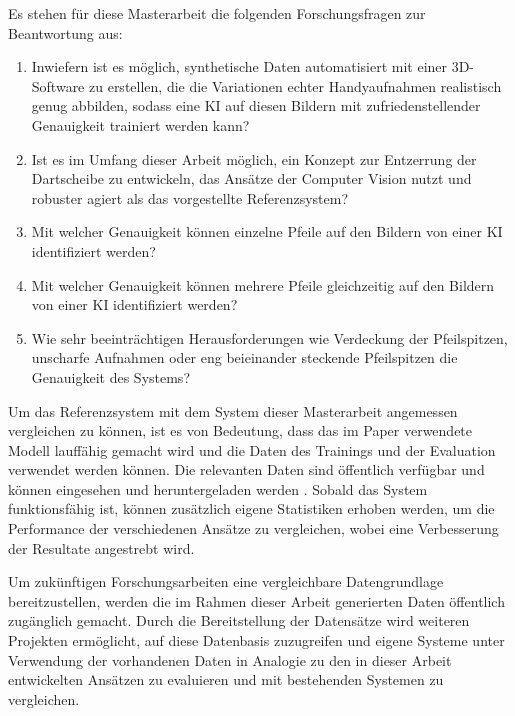 Es stehen für diese Masterarbeit die folgenden Forschungsfragen zur Beantwortung aus:

\begin{enumerate}
    \item Inwiefern ist es möglich, synthetische Daten automatisiert mit einer 3D-Software zu erstellen, die die Variationen echter Handyaufnahmen realistisch genug abbilden, sodass eine KI auf diesen Bildern mit zufriedenstellender Genauigkeit trainiert werden kann?
    \item Ist es im Umfang dieser Arbeit möglich, ein Konzept zur Entzerrung der Dartscheibe zu entwickeln, das Ansätze der Computer Vision nutzt und robuster agiert als das vorgestellte Referenzsystem?
    \item Mit welcher Genauigkeit können einzelne Pfeile auf den Bildern von einer KI identifiziert werden?
    \item Mit welcher Genauigkeit können mehrere Pfeile gleichzeitig auf den Bildern von einer KI identifiziert werden?
    \item Wie sehr beeinträchtigen Herausforderungen wie Verdeckung der Pfeilspitzen, unscharfe Aufnahmen oder eng beieinander steckende Pfeilspitzen die Genauigkeit des Systems?
\end{enumerate}

Um das Referenzsystem mit dem System dieser Masterarbeit angemessen vergleichen zu können, ist es von Bedeutung, dass das im Paper verwendete Modell lauffähig gemacht wird und die Daten des Trainings und der Evaluation verwendet werden können. Die relevanten Daten sind öffentlich verfügbar und können eingesehen und heruntergeladen werden \cite{deepdarts-data}. Sobald das System funktionsfähig ist, können zusätzlich eigene Statistiken erhoben werden, um die Performance der verschiedenen Ansätze zu vergleichen, wobei eine Verbesserung der Resultate angestrebt wird.

Um zukünftigen Forschungsarbeiten eine vergleichbare Datengrundlage bereitzustellen, werden die im Rahmen dieser Arbeit generierten Daten öffentlich zugänglich gemacht. Durch die Bereitstellung der Datensätze wird weiteren Projekten ermöglicht, auf diese Datenbasis zuzugreifen und eigene Systeme unter Verwendung der vorhandenen Daten in Analogie zu den in dieser Arbeit entwickelten Ansätzen zu evaluieren und mit bestehenden Systemen zu vergleichen.

\iffalse

